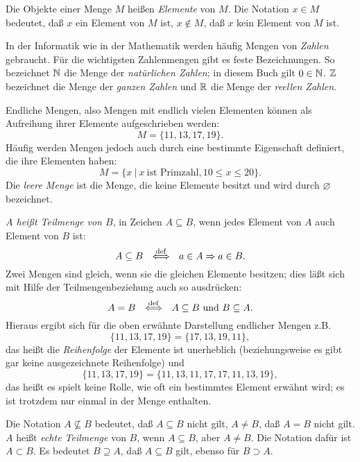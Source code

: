 Die Objekte einer Menge $M$ heißen \emph{Elemente} von $M$. Die Notation
$ x \in M$ 
bedeutet, daß $x$ ein Element von $M$ ist, $x \not \in M$, daß $x$ kein
Element von $M$ ist.

In der Informatik wie in der Mathematik werden häufig Mengen von \emph{Zahlen} gebraucht.  Für die wichtigsten
Zahlenmengen gibt es feste Bezeichnungen.  So bezeichnet $\mathbb{N}$
die Menge der \emph{natürlichen Zahlen};  in diesem Buch gilt
$0\in\mathbb{N}$. 
$\mathbb{Z}$ bezeichnet die Menge der \emph{ganzen Zahlen} und $\mathbb{R}$ die Menge der
\emph{reellen Zahlen}.

Endliche Mengen, also Mengen mit endlich vielen Elementen
können als Aufreihung ihrer Elemente aufgeschrieben werden:
\[M = \{ 11, 13, 17, 19\}.\]
Häufig werden Mengen jedoch auch durch eine bestimmte Eigenschaft de\-fi\-niert,
die ihre Elementen haben:
\[M = \{x\ |\ x\ \mbox{ist Primzahl}, 10 \le x \le 20\}.\]
Die \emph{leere Menge} %
ist die Menge, die keine Elemente besitzt und wird
durch $\varnothing$ bezeichnet.

\emph{$A$ heißt Teilmenge von $B$}, in Zeichen $A \subseteq B$, 
wenn jedes Element von $A$ auch Element von $B$ ist:
\[A \subseteq B\ \ \diff\ \ 
a \in A \Rightarrow a \in B.\]
Zwei Mengen sind gleich, wenn sie die gleichen Elemente besitzen; 
dies läßt sich mit Hilfe der Teilmengenbeziehung auch so ausdrücken:
\[A = B\ \ \stackrel{\rm def}{\Longleftrightarrow}\ \ A \subseteq B\ \mbox{und}\ B \subseteq A.\]
Hieraus ergibt sich für die oben erwähnte Darstellung endlicher Mengen
z.B.
\[\{11,13,17,19\} =\{17,13,19,11\},\]
das heißt die \emph{Reihenfolge} der Elemente ist unerheblich (beziehungsweise es gibt
gar keine ausgezeichnete Reihenfolge) und
\[\{11,13,17,19\} = \{11,13,11,17,17,11,13,19\},\]
das heißt es spielt keine Rolle, wie oft ein bestimmtes Element erwähnt wird; es
ist trotzdem nur einmal in der Menge enthalten.

Die Notation $A \not \subseteq B$ bedeutet, daß $A \subseteq B$ nicht gilt, $A
\not = B$, daß $A = B$ nicht gilt. $A$ heißt \emph{echte Teilmenge} von $B$,
wenn $A \subseteq B$, aber $A \not = B$. Die Notation dafür ist $A \subset B$.
\index{*@$\subset$}\index{*@$\supseteq$}\index{*@$\supset$}
Es bedeutet $B \supseteq A$, daß $A \subseteq B$ gilt, ebenso für
$B \supset A$. 

